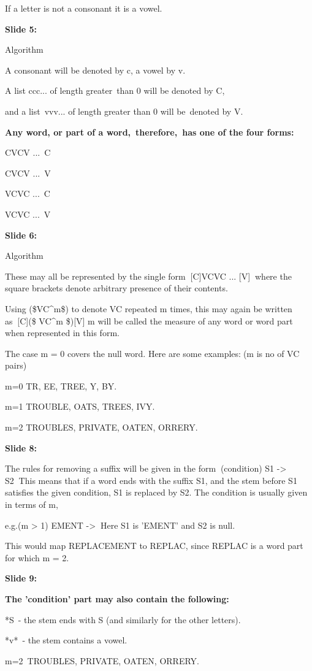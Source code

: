 \documentclass[11pt,a4paper]{article}
\begin{document}
If a letter is not a consonant it is a vowel.

\textbf{Slide 5:}

Algorithm

A consonant will be denoted by c, a vowel by v.

A list ccc... of length greater than 0 will be denoted by C,

and a list vvv... of length greater than 0 will be denoted by V.

\textbf{Any word, or part of a word, therefore, has one of the four forms:} 

CVCV ... C

CVCV ... V

VCVC ... C

VCVC ... V

\textbf{Slide 6:}

Algorithm

These may all be represented by the single form[C]VCVC ... [V]where the square brackets denote arbitrary presence of their contents.

Using (\$VC^m\$) to denote VC repeated m times, this may again be written as[C](\$ VC^m \$)[V] m will be called the measure of any word or word part when represented in this form.

The case m = 0 covers the null word. Here are some examples:(m is no of VC pairs)

m=0 TR, EE, TREE, Y, BY.

m=1 TROUBLE, OATS, TREES, IVY.

m=2 TROUBLES, PRIVATE, OATEN, ORRERY.

\textbf{Slide 8:}

The rules for removing a suffix will be given in the form(condition) S1 -> S2This means that if a word ends with the suffix S1, and the stem before S1 satisfies the given condition, S1 is replaced by S2. The condition is usually given in terms of m,

e.g.(m > 1) EMENT ->Here S1 is 'EMENT' and S2 is null.

This would map REPLACEMENT to REPLAC, since REPLAC is a word part for which m = 2.

\textbf{Slide 9:}

\textbf{The 'condition' part may also contain the following:} 

*S - the stem ends with S (and similarly for the other letters).

*v* - the stem contains a vowel.

m=2 TROUBLES, PRIVATE, OATEN, ORRERY.
\end{document}
